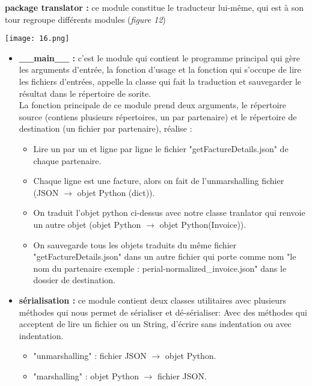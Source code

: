 \noindent\textbf{package translator :} ce module constitue le traducteur lui-même, qui est à son tour regroupe différents modules (\emph{figure 12})\\[0.5cm]
\begin{center}
	\texttt{[image: 16.png]}
\end{center}
\begin{itemize}
	\item \textbf{{\_}{\_}main{\_}{\_} :} c'est le module qui contient le programme principal qui gère les arguments d'entrée, la fonction d'usage et la fonction qui s'occupe de lire les fichiers d'entrées, appelle la classe qui fait la traduction et sauvegarder le résultat dans le répertoire de sorite.\\
	La fonction principale de ce module prend deux arguments, le répertoire source (contiens plusieurs répertoires, un par partenaire) et le répertoire de destination (un fichier par partenaire), réalise :\\
	\begin{itemize}
		\item Lire un par un et ligne par ligne le fichier "getFactureDetails.json" de chaque partenaire. 
		\item Chaque ligne est une facture, alors on fait de l'unmarshalling fichier (JSON $\to$ objet Python (dict)).
		\item On traduit l'objet python ci-dessus avec notre classe tranlator qui renvoie un autre objet (objet Python $\to$ objet Python(Invoice)).
		\item On sauvegarde tous les objets traduits du même fichier "getFactureDetails.json" dans un autre fichier qui porte comme nom "le nom du partenaire exemple : perial-normalized{\_}invoice.json" dans le dossier de destination.
	\end{itemize}  
	\item \textbf{sérialisation :} ce module contient deux classes utilitaires avec plusieurs méthodes qui nous permet de sérialiser et  dé-sérialiser:
	Avec des méthodes qui acceptent de lire un fichier ou un String, d'écrire sans indentation ou avec indentation.
	\begin{itemize}
		\item "unmarshalling" : fichier JSON $\to$ objet Python.
		\item "marshalling" : objet Python $\to$ fichier JSON.  

\end{itemize}
\end{itemize}
